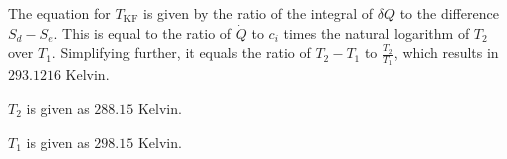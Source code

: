 The equation for \( T_{\text{KF}} \) is given by the ratio of the integral of \( \delta Q \) to the difference \( S_d - S_e \). This is equal to the ratio of \( \dot{Q} \) to \( c_{i} \) times the natural logarithm of \( T_2 \) over \( T_1 \). Simplifying further, it equals the ratio of \( T_2 - T_1 \) to \( \frac{T_2}{T_1} \), which results in \( 293.1216 \) Kelvin.

\( T_2 \) is given as \( 288.15 \) Kelvin.

\( T_1 \) is given as \( 298.15 \) Kelvin.